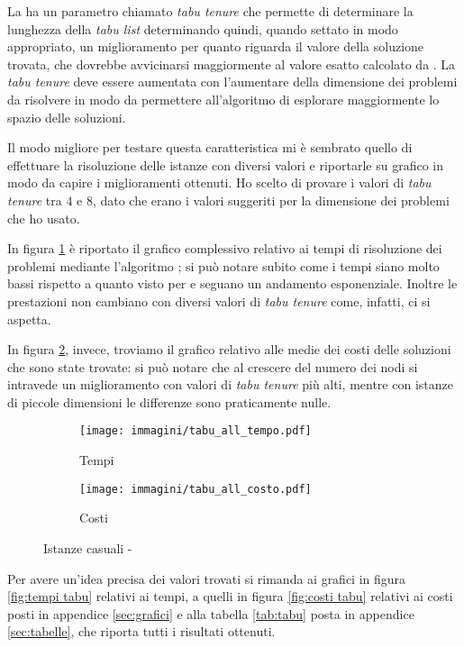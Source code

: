 La \tabu ha un parametro chiamato \emph{tabu tenure} che permette di determinare la lunghezza della \emph{tabu list} determinando quindi, quando settato in modo appropriato, un miglioramento per quanto riguarda il valore della soluzione trovata, che dovrebbe avvicinarsi maggiormente al valore esatto calcolato da .
La \emph{tabu tenure} deve essere aumentata con l'aumentare della dimensione dei problemi da risolvere in modo da permettere all'algoritmo di esplorare maggiormente lo spazio delle soluzioni.

Il modo migliore per testare questa caratteristica mi è sembrato quello di effettuare la risoluzione delle istanze con diversi valori e riportarle su grafico in modo da capire i miglioramenti ottenuti.
Ho scelto di provare i valori di \emph{tabu tenure} tra $4$ e $8$, dato che erano i valori suggeriti per la dimensione dei problemi che ho usato.

In figura \ref{fig:all tempi tabu} è riportato il grafico complessivo relativo ai tempi di risoluzione dei problemi mediante l'algoritmo \tabu; si può notare subito come i tempi siano molto bassi rispetto a quanto visto per  e seguano un andamento esponenziale.
Inoltre le prestazioni non cambiano con diversi valori di \emph{tabu tenure} come, infatti, ci si aspetta.

In figura \ref{fig:all costi tabu}, invece, troviamo il grafico relativo alle medie dei costi delle soluzioni che sono state trovate: si può notare che al crescere del numero dei nodi si intravede un miglioramento con valori di \emph{tabu tenure} più alti, mentre con istanze di piccole dimensioni le differenze sono praticamente nulle.

\begin{figure}[htb]
	\centering
	\begin{subfigure}[b]{.45\textwidth}
			\texttt{[image: immagini/tabu\_all\_tempo.pdf]}
			\caption{Tempi}
			\label{fig:all tempi tabu}
	\end{subfigure}
	\quad
	\begin{subfigure}[b]{.45\textwidth}
			\texttt{[image: immagini/tabu\_all\_costo.pdf]}
			\caption{Costi}
			\label{fig:all costi tabu}
	\end{subfigure}
	\caption{Istanze casuali - \tabu}
	\label{fig:all tempi costi tabu}
\end{figure}

Per avere un'idea precisa dei valori trovati si rimanda ai grafici in figura \ref{fig:tempi tabu} relativi ai tempi, a quelli in figura \ref{fig:costi tabu} relativi ai costi posti in appendice \ref{sec:grafici} e alla tabella \ref{tab:tabu} posta in appendice \ref{sec:tabelle}, che riporta tutti i risultati ottenuti.